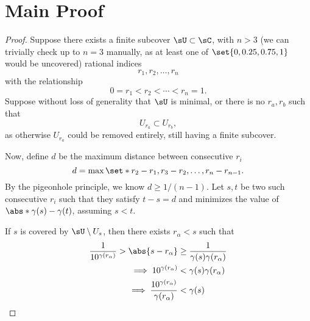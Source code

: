 \documentclass{article}
\newcommand{\Rt}[1]{\dfrac{1}{10^{#1}}}
\begin{document}
\section{Main Proof}
\begin{proof}
  Suppose there exists a finite subcover $\sU \subset \sC$,
  with $n > 3$ (we can trivially check up to $n = 3$ manually, as at least one of $\set{0, 0.25, 0.75, 1}$ would be uncovered) rational indices
  \[ r_{1}, r_{2}, \ldots, r_{n} \]
  with the relationship
  \[ 0 = r_{1} < r_{2} < \cdots < r_{n} = 1. \]
  Suppose without loss of generality that $\sU$ is minimal, or there is no $r_{a}, r_{b}$ such that
  \[ U_{r_{a}} \subset U_{r_{b}}, \]
  as otherwise $U_{r_{a}}$ could be removed entirely, still having a finite subcover.

  Now, define $d$ be the maximum distance between consecutive $r_{i}$
  \[ d = \max\set*{r_{2} - r_{1}, r_{3} - r_{2}, \ldots, r_{n} - r_{n - 1}}. \]
  By the pigeonhole principle, we know $d \ge 1/(n - 1)$.
  Let $s, t$ be two such consecutive $r_{i}$ such that they satisfy $t - s = d$ and minimizes the value of $\abs*{\gamma(s) - \gamma(t)}$,
  assuming $s < t$.

  If $s$ is covered by $\sU \setminus U_{s}$, then there exists $r_{\alpha} < s$ such that
  \begin{align*}
    \Rt{\gamma(r_\alpha)} > \abs{s - r_{\alpha}} &\ge \frac{1}{\gamma(s)\gamma(r_{\alpha})}\\
    \implies 10^{\gamma(r_{\alpha})} &< \gamma(s)\gamma(r_{\alpha})\\
    \implies \frac{10^{\gamma(r_{\alpha})}}{\gamma(r_{\alpha})} &< \gamma(s)\\
  \end{align*}
\end{proof}
\end{document}
